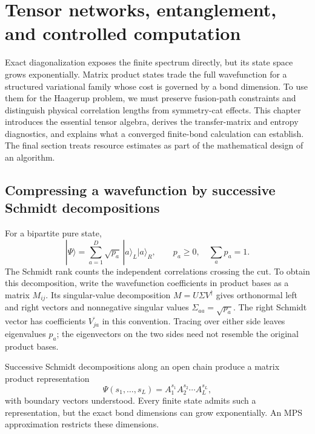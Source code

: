 \chapter{Tensor networks, entanglement, and controlled computation}
\label{ch:tensor_networks}

Exact diagonalization exposes the finite spectrum directly, but its state
space grows exponentially. Matrix product states trade the full wavefunction
for a structured variational family whose cost is governed by a bond
dimension. To use them for the Haagerup problem, we must preserve fusion-path
constraints and distinguish physical correlation lengths from symmetry-cat
effects. This chapter introduces the essential tensor algebra, derives the
transfer-matrix and entropy diagnostics, and explains what a converged
finite-bond calculation can establish. The final section treats resource
estimates as part of the mathematical design of an algorithm.

\section{Compressing a wavefunction by successive Schmidt decompositions}

For a bipartite pure state,
\[
 |\Psi\rangle=\sum_{a=1}^D\sqrt{p_a}\,
       |a\rangle_L|a\rangle_R,
 \qquad p_a\geq0,\quad\sum_ap_a=1.
\]
The Schmidt rank counts the independent correlations crossing the cut.
To obtain this decomposition, write the wavefunction coefficients in
product bases as a matrix $M_{ij}$. Its singular-value decomposition
$M=U\Sigma V^\dagger$ gives orthonormal left and right vectors and
nonnegative singular values $\Sigma_{aa}=\sqrt{p_a}$. The right
Schmidt vector has coefficients $\overline{V_{ja}}$ in this
convention. Tracing over either side leaves eigenvalues $p_a$;
the eigenvectors on the two sides need not resemble the original
product bases.

Successive Schmidt decompositions along an open chain produce a matrix
product representation
\[
 \Psi(s_1,\ldots,s_L)
 =A^{s_1}_1A^{s_2}_2\cdots A^{s_L}_L,
\]
with boundary vectors understood. Every finite state admits such a
representation, but the exact bond dimensions can grow exponentially.
An MPS approximation restricts these dimensions.

